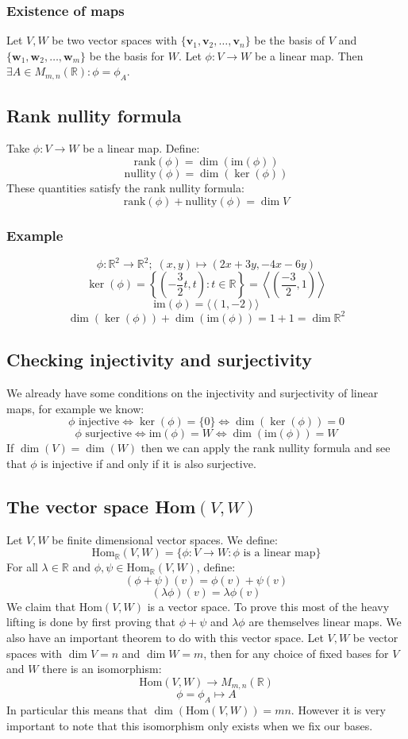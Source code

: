 \documentclass[12pt]{article}
\newcommand{\arbvec}[2]{\ensuremath{\textbf{#1}_1,\textbf{#1}_2,\dots,\textbf{#1}_{#2}}}
\begin{document}
\subsubsection*{Existence of maps}
Let \(V,W\) be two vector spaces with \(\{\arbvec{v}{n}\}\) be the basis of \(V\) and \(\{\arbvec{w}{m}\}\) be the basis for \(W\). Let \(\phi:V\to W\) be a linear map. Then \(\exists A\in M_{m,n}(\mathbb{R}):\phi=\phi_A\).
\subsection*{Rank nullity formula}
Take \(\phi:V\to W\) be a linear map. Define:
\[\text{rank}(\phi)=\dim(\text{im}(\phi))\]
\[\text{nullity}(\phi)=\dim(\ker(\phi))\]
These quantities satisfy the rank nullity formula:
\[\text{rank}(\phi)+\text{nullity}(\phi)=\dim V\]
\subsubsection*{Example}
\[\phi:\mathbb{R}^2\to\mathbb{R}^2;\; (x,y)\mapsto(2x+3y,-4x-6y)\]
\[\ker(\phi)=\left\{\left(-\frac{3}{2}t,t\right):t\in \mathbb{R}\right\}=\left\langle\left(\frac{-3}{2},1\right)\right\rangle \]
\[\text{im}(\phi)=\langle(1,-2)\rangle\]
\[\dim(\ker(\phi))+\dim(\text{im}(\phi))=1+1=\dim{\mathbb{R}^2}\]
\subsection*{Checking injectivity and surjectivity}
We already have some conditions on the injectivity and surjectivity of linear maps, for example we know:
\[\phi \text{ injective}\iff \ker(\phi)=\{0\}\iff\dim(\ker(\phi))=0\]
\[\phi\text{ surjective}\iff \text{im}(\phi)=W\iff \dim(\text{im}(\phi))=W\]
If \(\dim(V)=\dim(W)\) then we can apply the rank nullity formula and see that \(\phi\) is injective if and only if it is also surjective.
\subsection*{The vector space Hom\((V,W)\)}
Let \(V,W\) be finite dimensional vector spaces. We define:
\[\text{Hom}_\mathbb{R}(V,W)=\{\phi:V\to W: \phi \text{ is a linear map}\}\]
For all \(\lambda\in \mathbb{R}\) and \(\phi,\psi\in \text{Hom}_\mathbb{R}(V,W)\), define:
\[(\phi+\psi)(v)=\phi(v)+\psi(v)\]
\[(\lambda \phi)(v)=\lambda\phi(v)\]
We claim that Hom\((V,W)\) is a vector space. To prove this most of the heavy lifting is done by first proving that \(\phi+\psi\) and \(\lambda\phi\) are themselves linear maps. We also have an important theorem to do with this vector space. Let \(V,W\) be vector spaces with \(\dim V=n\) and \(\dim W=m\), then for any choice of fixed bases for \(V\) and \(W\) there is an isomorphism:
\[\text{Hom}(V,W)\to M_{m,n}(\mathbb{R})\]
\[\phi=\phi_A\mapsto A\]
In particular this means that \(\dim(\text{Hom}(V,W))=mn\). However it is very important to note that this isomorphism only exists when we fix our bases.
\end{document}
